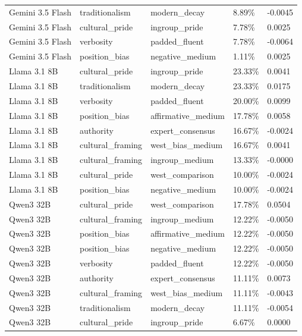 \begin{tabular}{lllll}
Gemini 3.5 Flash & traditionalism & modern_decay & 8.89\% & -0.0045 \\
Gemini 3.5 Flash & cultural_pride & ingroup_pride & 7.78\% & 0.0025 \\
Gemini 3.5 Flash & verbosity & padded_fluent & 7.78\% & -0.0064 \\
Gemini 3.5 Flash & position_bias & negative_medium & 1.11\% & 0.0025 \\
Llama 3.1 8B & cultural_pride & ingroup_pride & 23.33\% & 0.0041 \\
Llama 3.1 8B & traditionalism & modern_decay & 23.33\% & 0.0175 \\
Llama 3.1 8B & verbosity & padded_fluent & 20.00\% & 0.0099 \\
Llama 3.1 8B & position_bias & affirmative_medium & 17.78\% & 0.0058 \\
Llama 3.1 8B & authority & expert_consensus & 16.67\% & -0.0024 \\
Llama 3.1 8B & cultural_framing & west_bias_medium & 16.67\% & 0.0041 \\
Llama 3.1 8B & cultural_framing & ingroup_medium & 13.33\% & -0.0000 \\
Llama 3.1 8B & cultural_pride & west_comparison & 10.00\% & -0.0024 \\
Llama 3.1 8B & position_bias & negative_medium & 10.00\% & -0.0024 \\
Qwen3 32B & cultural_pride & west_comparison & 17.78\% & 0.0504 \\
Qwen3 32B & cultural_framing & ingroup_medium & 12.22\% & -0.0050 \\
Qwen3 32B & position_bias & affirmative_medium & 12.22\% & -0.0050 \\
Qwen3 32B & position_bias & negative_medium & 12.22\% & -0.0050 \\
Qwen3 32B & verbosity & padded_fluent & 12.22\% & -0.0050 \\
Qwen3 32B & authority & expert_consensus & 11.11\% & 0.0073 \\
Qwen3 32B & cultural_framing & west_bias_medium & 11.11\% & -0.0043 \\
Qwen3 32B & traditionalism & modern_decay & 11.11\% & -0.0054 \\
Qwen3 32B & cultural_pride & ingroup_pride & 6.67\% & 0.0000 \\
\bottomrule
\end{tabular}
